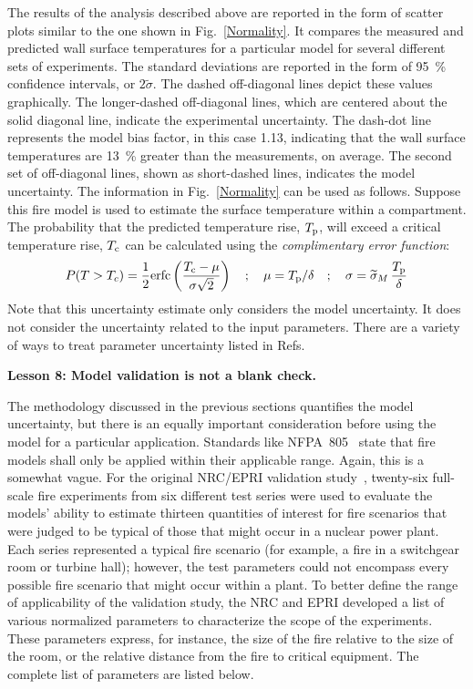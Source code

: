 \documentclass[fleqn,b5paper]{article}
\begin{document}
The results of the analysis described above are reported in the form of scatter plots similar to the one shown in Fig.~\ref{Normality}. It compares the measured and predicted wall surface temperatures for a particular model for several different sets of experiments. The standard deviations are reported in the form of 95~\% confidence intervals, or $2\widetilde{\sigma}$. The dashed off-diagonal lines depict these values graphically. The longer-dashed off-diagonal lines, which are centered about the solid diagonal line, indicate the experimental uncertainty.  The dash-dot line represents the model bias factor, in this case 1.13, indicating that the wall surface temperatures are 13~\% greater than the measurements, on average. The second set of off-diagonal lines, shown as short-dashed lines, indicates the model uncertainty. The information in Fig.~\ref{Normality} can be used as follows. Suppose this fire model is used to estimate the surface temperature within a compartment. The probability that the predicted temperature rise, $T_{\rm p}$, will exceed a critical temperature rise, $T_{\rm c}$ can be calculated using the {\em complimentary error function}:
\begin{equation}
   P(T>T_c) = \frac{1}{2} \hbox{erfc} \left( \frac{T_{\rm c} - \mu}{\sigma \sqrt{2}} \right) \quad ; \quad \mu=T_{\rm p}/\delta \quad ; \quad \sigma = \widetilde{\sigma}_M \, \frac{T_{\rm p}}{\delta}
\end{equation}
Note that this uncertainty estimate only considers the model uncertainty. It does not consider the uncertainty related to the input parameters. There are a variety of ways to treat parameter uncertainty listed in Refs.~\cite{ASTM:E1355,ISO16730,NUREG_1934,SFPE_G.06}




\vspace{\parskip}
{\bf Lesson 8: Model validation is not a blank check.}

The methodology discussed in the previous sections quantifies the model uncertainty, but there is an equally important consideration before using the model for a particular application. Standards like NFPA~805~\cite{NFPA_805} state that fire models shall only be applied within their applicable range. Again, this is a somewhat vague. For the original NRC/EPRI validation study~\cite{NUREG_1824}, twenty-six full-scale fire experiments from six different test series were used to evaluate the models' ability to estimate thirteen quantities of interest for fire scenarios that were judged to be typical of those that might occur in a nuclear power plant. Each series represented a typical fire scenario (for example, a fire in a switchgear room or turbine hall); however, the test parameters could not encompass every possible fire scenario that might occur within a plant. To better define the range of applicability of the validation study, the NRC and EPRI developed a list of various normalized parameters to characterize the scope of the experiments. These parameters express, for instance, the size of the fire relative to the size of the room, or the relative distance from the fire to critical equipment. The complete list of parameters are listed below.
\end{document}
